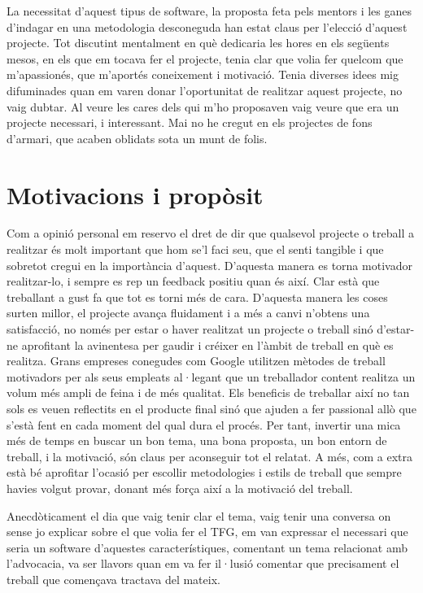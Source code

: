 \documentclass[letterpaper,11pt,catalan]{sphinxmanual}
\begin{document}
La necessitat d'aquest tipus de software, la proposta feta pels mentors i les ganes
d'indagar en una metodologia desconeguda han estat claus per l'elecció d'aquest projecte.
Tot discutint mentalment en què dedicaria les hores en els següents mesos, en els que em
tocava fer el projecte, tenia clar que volia fer quelcom que m'apassionés, que m'aportés coneixement
i motivació. Tenia diverses idees mig difuminades quan em varen donar l'oportunitat de realitzar
aquest projecte, no vaig dubtar. Al veure les cares dels qui m'ho proposaven vaig veure que
era un projecte necessari, i interessant. Mai no he cregut en els projectes de fons d'armari,
que acaben oblidats sota un munt de folis.


\section{Motivacions i propòsit}
\label{\detokenize{index:motivacions-i-proposit}}
Com a opinió personal em reservo el dret de dir que qualsevol projecte o treball a realitzar és
molt important que hom se'l faci seu, que el senti tangible i que sobretot cregui en la importància d'aquest.
D'aquesta manera es torna motivador realitzar-lo, i sempre es rep un feedback positiu quan és així.
Clar està que treballant a gust fa que tot es torni més de cara. D'aquesta manera les coses surten
millor, el projecte avança fluidament i a més a canvi n'obtens una satisfacció, no només per estar o
haver realitzat un projecte o treball sinó d'estar-ne aprofitant la avinentesa per gaudir i créixer
en l'àmbit de treball en què es realitza. Grans empreses conegudes com Google utilitzen mètodes
de treball motivadors per als seus empleats al·legant que un treballador content realitza un volum més
ampli de feina i de més qualitat. Els beneficis de treballar així no tan sols es veuen reflectits
en el producte final sinó que ajuden a fer passional allò que s'està fent en cada moment del qual dura
el procés. Per tant, invertir una mica més de temps en buscar un bon tema, una bona proposta, un bon
entorn de treball, i la motivació, són claus per aconseguir tot el relatat. A més, com a extra està bé
aprofitar l'ocasió per escollir metodologies i estils de treball que sempre havies volgut provar,
donant més força així a la motivació del treball.

Anecdòticament el dia que vaig tenir clar el tema, vaig tenir una conversa on sense jo explicar
sobre el que volia fer el TFG, em van expressar el necessari que seria un software d'aquestes
característiques, comentant un tema relacionat amb l'advocacia, va ser llavors quan em va
fer il·lusió comentar que precisament el treball que començava tractava del mateix.
\end{document}
